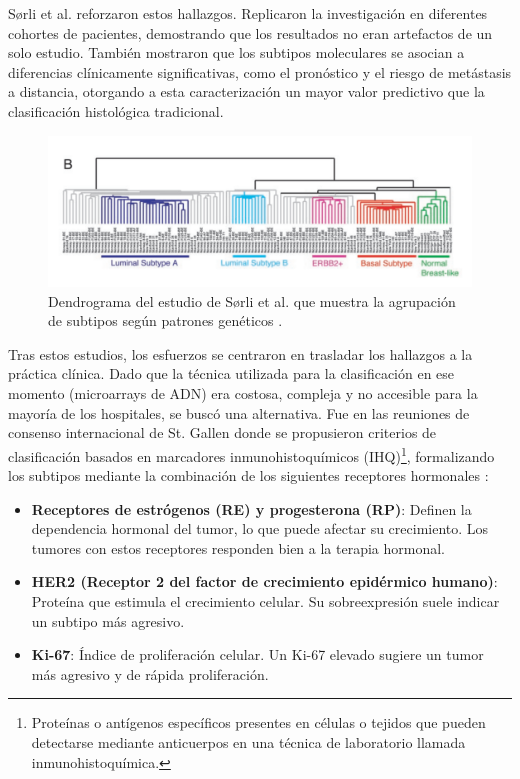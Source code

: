 \documentclass[a4paper,10pt]{book}
\begin{document}
Sørli et al. reforzaron estos hallazgos. Replicaron la investigación en diferentes cohortes de pacientes, demostrando que los resultados no eran artefactos de un solo estudio. También mostraron que los subtipos moleculares se asocian a diferencias clínicamente significativas, como el pronóstico y el riesgo de metástasis a distancia, otorgando a esta caracterización un mayor valor predictivo que la clasificación histológica tradicional.

\begin{figure}
	\centering
	\includegraphics[width=0.8\linewidth]{reports//assets/dendogram.png}
	\caption[Dendrograma de subtipos moleculares según Sørli et al.]{Dendrograma del estudio de Sørli et al. que muestra la agrupación de subtipos según patrones genéticos \cite{sorlie_repeated_2003}.}
	\label{fig:sorlie-dandrogram}
\end{figure}


Tras estos estudios, los esfuerzos se centraron en trasladar los hallazgos a la práctica clínica. Dado que la técnica utilizada para la clasificación en ese momento (microarrays de ADN) era costosa, compleja y no accesible para la mayoría de los hospitales, se buscó una alternativa. Fue en las reuniones de consenso internacional de St. Gallen donde se propusieron criterios de clasificación basados en marcadores inmunohistoquímicos (IHQ)\footnote{Proteínas o antígenos específicos presentes en células o tejidos que pueden detectarse mediante anticuerpos en una técnica de laboratorio llamada inmunohistoquímica.}, formalizando los subtipos mediante la combinación de los siguientes receptores hormonales \cite{lips_breast_2013}:

\begin{itemize}
	\item \textbf{Receptores de estrógenos (RE) y progesterona (RP)}: Definen la dependencia hormonal del tumor, lo que puede afectar su crecimiento. Los tumores con estos receptores responden bien a la terapia hormonal.
	\item \textbf{HER2 (Receptor 2 del factor de crecimiento epidérmico humano)}: Proteína que estimula el crecimiento celular. Su sobreexpresión suele indicar un subtipo más agresivo.
	\item \textbf{Ki-67}: Índice de proliferación celular. Un Ki-67 elevado sugiere un tumor más agresivo y de rápida proliferación.
\end{itemize}
\end{document}
